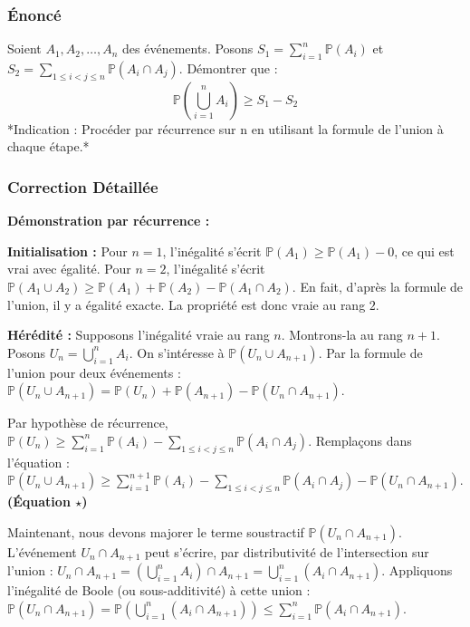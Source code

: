 \documentclass[11pt,a4paper]{article}
\begin{document}
\subsubsection*{Énoncé}

Soient $A_1, A_2, \dots, A_n$ des événements. Posons $S_1 = \sum_{i=1}^n \mathbb{P}(A_i)$ et $S_2 = \sum_{1 \le i < j \le n} \mathbb{P}(A_i \cap A_j)$.
Démontrer que :
$$ \mathbb{P}\left(\bigcup_{i=1}^n A_i\right) \ge S_1 - S_2 $$
*Indication : Procéder par récurrence sur n en utilisant la formule de l'union à chaque étape.*


\subsubsection*{Correction Détaillée}

\textbf{Démonstration par récurrence :}

\textbf{Initialisation :}
Pour $n=1$, l'inégalité s'écrit $\mathbb{P}(A_1) \ge \mathbb{P}(A_1) - 0$, ce qui est vrai avec égalité.
Pour $n=2$, l'inégalité s'écrit $\mathbb{P}(A_1 \cup A_2) \ge \mathbb{P}(A_1) + \mathbb{P}(A_2) - \mathbb{P}(A_1 \cap A_2)$. En fait, d'après la formule de l'union, il y a égalité exacte. La propriété est donc vraie au rang $2$.

\textbf{Hérédité :}
Supposons l'inégalité vraie au rang $n$. Montrons-la au rang $n+1$.
Posons $U_n = \bigcup_{i=1}^n A_i$. On s'intéresse à $\mathbb{P}(U_n \cup A_{n+1})$.
Par la formule de l'union pour deux événements :
$\mathbb{P}(U_n \cup A_{n+1}) = \mathbb{P}(U_n) + \mathbb{P}(A_{n+1}) - \mathbb{P}(U_n \cap A_{n+1})$.

Par hypothèse de récurrence, $\mathbb{P}(U_n) \ge \sum_{i=1}^n \mathbb{P}(A_i) - \sum_{1 \le i < j \le n} \mathbb{P}(A_i \cap A_j)$.
Remplaçons dans l'équation :
$\mathbb{P}(U_n \cup A_{n+1}) \ge \sum_{i=1}^{n+1} \mathbb{P}(A_i) - \sum_{1 \le i < j \le n} \mathbb{P}(A_i \cap A_j) - \mathbb{P}(U_n \cap A_{n+1})$.  \textbf{(Équation $\star$)}

Maintenant, nous devons majorer le terme soustractif $\mathbb{P}(U_n \cap A_{n+1})$.
L'événement $U_n \cap A_{n+1}$ peut s'écrire, par distributivité de l'intersection sur l'union :
$U_n \cap A_{n+1} = \left(\bigcup_{i=1}^n A_i\right) \cap A_{n+1} = \bigcup_{i=1}^n (A_i \cap A_{n+1})$.
Appliquons l'inégalité de Boole (ou sous-additivité) à cette union :
$\mathbb{P}(U_n \cap A_{n+1}) = \mathbb{P}\left(\bigcup_{i=1}^n (A_i \cap A_{n+1})\right) \le \sum_{i=1}^n \mathbb{P}(A_i \cap A_{n+1})$.
\end{document}
